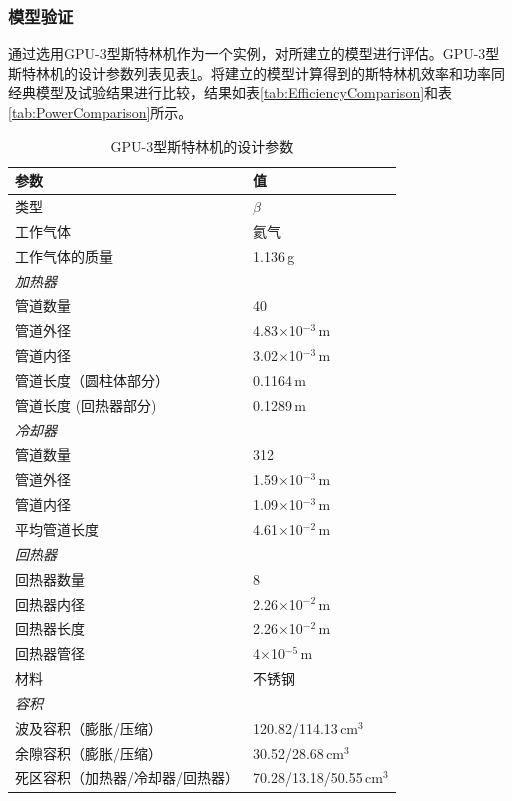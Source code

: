 \subsubsection{模型验证}
\label{sec:modelValidation}

通过选用GPU-3型斯特林机作为一个实例，对所建立的模型进行评估。GPU-3型斯特林机的设计参数列表见表\ref{tab:GPU3parameters}。将建立的模型计算得到的斯特林机效率和功率同经典模型及试验结果进行比较，结果如表\ref{tab:EfficiencyComparison}和表\ref{tab:PowerComparison}所示。

\begin{table}[htbp]\footnotesize
	\caption{GPU-3型斯特林机的设计参数\cite{Babaelahi2015,Martini1983}}
	\begin{center}
	\begin{tabular}{ll}
		\toprule
		参数				&	值\\
		\midrule
		类型					&	$\beta$\\
		工作气体			&	氦气\\
		工作气体的质量	&	1.136\,g\\
		\emph{加热器}			&\\
		管道数量		&	40\\
		管道外径	&	4.83$\times$10$^{-3}\,\mathrm{m}$\\
		管道内径	&	3.02$\times$10$^{-3}\,\mathrm{m}$\\
		管道长度（圆柱体部分）		&	0.1164\,m\\
		管道长度 (回热器部分)		&	0.1289\,m\\
		\emph{冷却器}			&\\
		管道数量		&	312\\
		管道外径	&	1.59$\times$10$^{-3}\,\mathrm{m}$\\
		管道内径	&	1.09$\times$10$^{-3}\,\mathrm{m}$\\
		平均管道长度		&	4.61$\times$10$^{-2}\,\mathrm{m}$\\
		\emph{回热器}		&\\
		回热器数量	&	8\\
		回热器内径	&	2.26$\times$10$^{-2}\,\mathrm{m}$\\
		回热器长度		&	2.26$\times$10$^{-2}\,\mathrm{m}$\\
		回热器管径	&	4$\times$10$^{-5}\,\mathrm{m}$\\
		材料				&	不锈钢\\
		\emph{容积}			&\\
		波及容积（膨胀/压缩）	&	120.82/114.13\,$\mathrm{cm}^3$\\
		余隙容积（膨胀/压缩）	&	30.52/28.68\,$\mathrm{cm}^3$\\
		死区容积（加热器/冷却器/回热器）	&	70.28/13.18/50.55\,$\mathrm{cm}^3$\\
		\bottomrule
	\end{tabular}
	\end{center}
	\label{tab:GPU3parameters}
\end{table}

